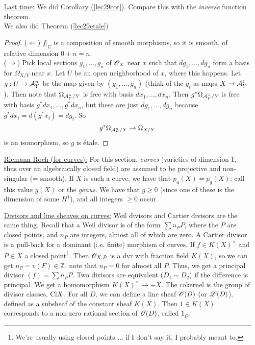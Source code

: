  \setcounter{lecture}{30}

 \underline{Last time:} We did Corollary (\ref{lec29cor}).
 Compare this with the \emph{inverse} function theorem.\\
 We also did Theorem (\ref{lec29etale})
 \begin{proof}
 ($\Leftarrow$) $f|_U$ is a composition of smooth morphisms, so it
 is smooth, of relative dimension $0+n=n$.\\
 ($\Rightarrow$)  Pick local sections $g_1,\dots, g_n$ of $\mathscr{O}_X$
 near $x$ such that $dg_1,\dots,dg_n$ form a basis for
 $\Omega_{X/Y}$ near $x$.  Let $U$ be an open neighborhood of $x$,
 where this happens.  Let $g:U\to \mathcal{A}^n_Y$ be the map given by
 $(g_1,\dots, g_n)$ (think of the $g_i$ as maps $X\to \mathcal{A}^1_Y$).
 Then note that $\Omega_{\mathcal{A}^n_Y/Y}$ is free with basis
 $dx_1,\dots, dx_n$.  Then $g^* \Omega_{\mathcal{A}^n_Y/Y}$ is free with
 basis $g^*dx_1,\dots, g^*dx_n$, but these are just $dg_1,\dots,
 dg_n$ because $g^*dx_i=d(g^*x_i)=dg_i$.  So
 \[
    g^*\Omega_{\mathcal{A}^n_Y/Y} \to \Omega_{X/Y}
 \]
 is an isomorphism, so $g$ is \'etale.
 \end{proof}


 \underline{Riemann-Roch (for curves):}  For this section,
 \emph{curves} (varieties of dimension 1, thus over an
 algebraically closed field) are assumed to be projective and
 non-singular (= smooth).  If $X$ is such a curve, we have that
 $p_a(X)=p_g(X)$; call this value $g(X)$ or the \emph{genus}.  We
 have that $g\ge 0$ (since one of these is the dimension of some
 $H^1$), and all integers $\ge 0$ occur.

 \underline{Divisors and line sheaves on curves:} Weil divisors
 and Cartier divisors are the same thing.  Recall that a Weil
 divisor is of the form $\sum n_P P$, where the $P$ are closed points,
 and $n_P$ are integers, almost all of which are zero. A Cartier
 divisor is a pull-back for a dominant (i.e. finite) morphism of
 curves.  If $f\in K(X)^{\times}$ and $P\in X$ a closed
 point\footnote{We're usually using closed points ... if I don't say it, I probably meant
 to.}.  Then $\mathscr{O}_{X,P}$ is a dvr with fraction field $K(X)$, so we
 can get $n_P=v(F)\in \mathbb{Z}$.  note that $n_P=0$ for almost
 all $P$.  Thus, we get a principal divisor $(f)=\sum n_P P$.  Two
 divisors are equivalent ($D_1\sim D_2$) if the difference is
 principal.  We get a homomorphism $K(X)^{\times} \to \div X$.
 The cokernel is the group of divisor classes, $\text{\rm Cl} X$.  For all
 $D$, we can define a line sheaf $\mathscr{O}(D)$ (or $\mathscr{L}(D)$), defined as
 a subsheaf of the constant sheaf $K(X)$.  Then $1\in K(X)$
 corresponds to a non-zero rational section of $\mathscr{O}(D)$, called
 $1_D$.

